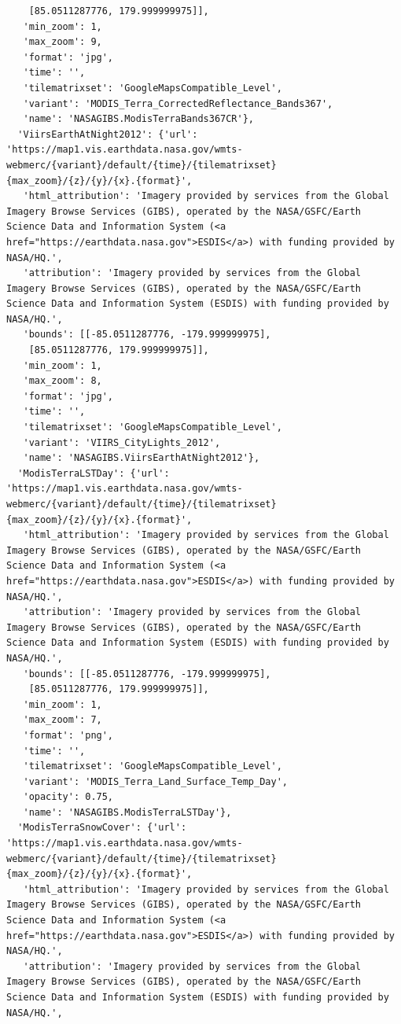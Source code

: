 \documentclass[
  letterpaper,
  DIV=11,
  numbers=noendperiod]{scrreprt}
\begin{document}
\begin{verbatim}
    [85.0511287776, 179.999999975]],
   'min_zoom': 1,
   'max_zoom': 9,
   'format': 'jpg',
   'time': '',
   'tilematrixset': 'GoogleMapsCompatible_Level',
   'variant': 'MODIS_Terra_CorrectedReflectance_Bands367',
   'name': 'NASAGIBS.ModisTerraBands367CR'},
  'ViirsEarthAtNight2012': {'url': 'https://map1.vis.earthdata.nasa.gov/wmts-webmerc/{variant}/default/{time}/{tilematrixset}{max_zoom}/{z}/{y}/{x}.{format}',
   'html_attribution': 'Imagery provided by services from the Global Imagery Browse Services (GIBS), operated by the NASA/GSFC/Earth Science Data and Information System (<a href="https://earthdata.nasa.gov">ESDIS</a>) with funding provided by NASA/HQ.',
   'attribution': 'Imagery provided by services from the Global Imagery Browse Services (GIBS), operated by the NASA/GSFC/Earth Science Data and Information System (ESDIS) with funding provided by NASA/HQ.',
   'bounds': [[-85.0511287776, -179.999999975],
    [85.0511287776, 179.999999975]],
   'min_zoom': 1,
   'max_zoom': 8,
   'format': 'jpg',
   'time': '',
   'tilematrixset': 'GoogleMapsCompatible_Level',
   'variant': 'VIIRS_CityLights_2012',
   'name': 'NASAGIBS.ViirsEarthAtNight2012'},
  'ModisTerraLSTDay': {'url': 'https://map1.vis.earthdata.nasa.gov/wmts-webmerc/{variant}/default/{time}/{tilematrixset}{max_zoom}/{z}/{y}/{x}.{format}',
   'html_attribution': 'Imagery provided by services from the Global Imagery Browse Services (GIBS), operated by the NASA/GSFC/Earth Science Data and Information System (<a href="https://earthdata.nasa.gov">ESDIS</a>) with funding provided by NASA/HQ.',
   'attribution': 'Imagery provided by services from the Global Imagery Browse Services (GIBS), operated by the NASA/GSFC/Earth Science Data and Information System (ESDIS) with funding provided by NASA/HQ.',
   'bounds': [[-85.0511287776, -179.999999975],
    [85.0511287776, 179.999999975]],
   'min_zoom': 1,
   'max_zoom': 7,
   'format': 'png',
   'time': '',
   'tilematrixset': 'GoogleMapsCompatible_Level',
   'variant': 'MODIS_Terra_Land_Surface_Temp_Day',
   'opacity': 0.75,
   'name': 'NASAGIBS.ModisTerraLSTDay'},
  'ModisTerraSnowCover': {'url': 'https://map1.vis.earthdata.nasa.gov/wmts-webmerc/{variant}/default/{time}/{tilematrixset}{max_zoom}/{z}/{y}/{x}.{format}',
   'html_attribution': 'Imagery provided by services from the Global Imagery Browse Services (GIBS), operated by the NASA/GSFC/Earth Science Data and Information System (<a href="https://earthdata.nasa.gov">ESDIS</a>) with funding provided by NASA/HQ.',
   'attribution': 'Imagery provided by services from the Global Imagery Browse Services (GIBS), operated by the NASA/GSFC/Earth Science Data and Information System (ESDIS) with funding provided by NASA/HQ.',

\end{verbatim}
\end{document}
